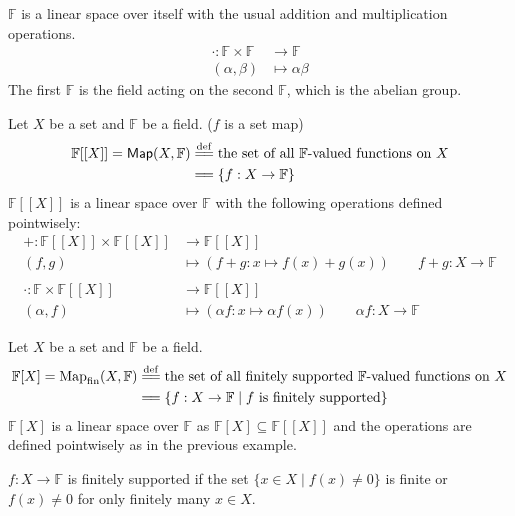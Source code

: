 \documentclass[
	11pt, %
	fleqn, %
	a4paper, %
]{LegrandOrangeBook}
\newcommand{\F}{\mathbb{F}} %
\newcommand{\Map}{\mathsf{Map}} %
\begin{document}
\begin{example}
    $\F$ is a linear space over itself with the usual addition and multiplication operations.
    \[
        \begin{split}
            \cdot : \F \times \F &\to \F \\
            (\alpha,\beta) &\mapsto \alpha \beta
        \end{split}
    \]
    The first $\F$ is the field acting on the second $\F$, which is the abelian group.
\end{example}

\begin{example}
    Let $X$ be a set and $\F$ be a field. ($f$ is a set map)
    \[
    \begin{split}
        \F[[X]] = \Map(X, \F) &\overset{\mathrm{def}}{=\joinrel=} \text{the set of all $\F$-valued functions on } X \\
        &=\joinrel= \left\{ f : X \to \F \right\}
    \end{split}
    \]
    $\F[[X]]$ is a linear space over $\F$ with the following operations defined pointwisely:
    \[
        \begin{split}
            + : \F[[X]] \times \F[[X]] &\to \F[[X]] \\
            (f,g) &\mapsto (f+g: x \mapsto f(x) + g(x)) \qquad f + g : X \to \F \\ \\
            \cdot : \F \times \F[[X]] &\to \F[[X]] \\
            (\alpha,f) &\mapsto (\alpha f: x \mapsto \alpha f(x)) \qquad \alpha f : X \to \F
        \end{split}
    \]
\end{example}

\begin{example}
    Let $X$ be a set and $\F$ be a field.
    \[
        \begin{split}
            \F[X] = \text{Map}_{\text{fin}}(X, \F) &\overset{\mathrm{def}}{=\joinrel=} \text{the set of all finitely supported $\F$-valued functions on } X \\
            &=\joinrel= \left\{ f : X \to \F \mid f \text{ is finitely supported} \right\}
        \end{split}
    \]
    $\F[X]$ is a linear space over $\F$ as $\F[X] \subseteq \F[[X]]$ and the operations are defined pointwisely as in the previous example.

    $f: X \to \F$ is finitely supported if the set $\{ x \in X \mid f(x) \neq 0 \}$ is finite or $f(x) \neq 0$ for only finitely many $x \in X$.
\end{example}
\end{document}
